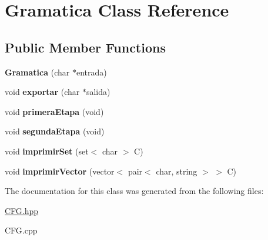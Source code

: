 \hypertarget{classGramatica}{}\section{Gramatica Class Reference}
\label{classGramatica}
\subsection*{Public Member Functions}
\begin{DoxyCompactItemize}
\item 
\hypertarget{classGramatica_a5f038b4e9d09088de18a9eb4825e707d}{}\label{classGramatica_a5f038b4e9d09088de18a9eb4825e707d} 
{\bfseries Gramatica} (char $\ast$entrada)
\item 
\hypertarget{classGramatica_ac34ba3e3666145001a7507beb8a77014}{}\label{classGramatica_ac34ba3e3666145001a7507beb8a77014} 
void {\bfseries exportar} (char $\ast$salida)
\item 
\hypertarget{classGramatica_a20660e4c2c86613f6a27a3001195e0d4}{}\label{classGramatica_a20660e4c2c86613f6a27a3001195e0d4} 
void {\bfseries primera\+Etapa} (void)
\item 
\hypertarget{classGramatica_ac34483015438d46169e6652d28b25f9f}{}\label{classGramatica_ac34483015438d46169e6652d28b25f9f} 
void {\bfseries segunda\+Etapa} (void)
\item 
\hypertarget{classGramatica_ac043e3f91df1ff977d3f9847ccb0180f}{}\label{classGramatica_ac043e3f91df1ff977d3f9847ccb0180f} 
void {\bfseries imprimir\+Set} (set$<$ char $>$ C)
\item 
\hypertarget{classGramatica_aba07f9d1eabb86a7ed1fb3c1cb8390c7}{}\label{classGramatica_aba07f9d1eabb86a7ed1fb3c1cb8390c7} 
void {\bfseries imprimir\+Vector} (vector$<$ pair$<$ char, string $>$ $>$ C)
\end{DoxyCompactItemize}


The documentation for this class was generated from the following files\+:\begin{DoxyCompactItemize}
\item 
\hyperlink{CFG_8hpp}{C\+F\+G.\+hpp}\item 
C\+F\+G.\+cpp\end{DoxyCompactItemize}
